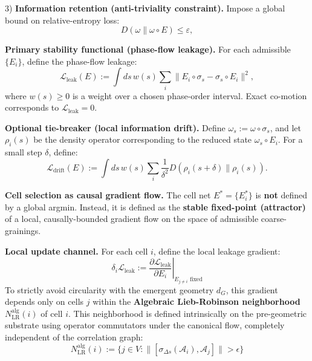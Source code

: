 \documentclass[reprint, amsmath, amssymb, aps, prd]{revtex4-2}
\begin{document}
3) \textbf{Information retention (anti-triviality constraint).} Impose a global bound on relative-entropy loss:
\begin{equation}
D( \omega \| \omega \circ E ) \leq \varepsilon,
\end{equation}

\textbf{Primary stability functional (phase-flow leakage).} For each admissible $\{E_i\}$, define the phase-flow leakage:
\begin{equation}
\mathcal{L}_{\text{leak}}(E) := \int ds \, w(s) \sum_i \| E_i \circ \sigma_s - \sigma_s \circ E_i \|^2,
\end{equation}
where $w(s) \geq 0$ is a weight over a chosen phase-order interval. Exact co-motion corresponds to $\mathcal{L}_{\text{leak}} = 0$.

\textbf{Optional tie-breaker (local information drift).} Define $\omega_s := \omega \circ \sigma_s$, and let $\rho_i(s)$ be the density operator corresponding to the reduced state $\omega_s \circ E_i$. For a small step $\delta$, define:
\begin{equation}
\mathcal{L}_{\text{drift}}(E) := \int ds \, w(s) \sum_i \frac{1}{\delta^2} D( \rho_i(s+\delta) \| \rho_i(s) ).
\end{equation}

\textbf{Cell selection as causal gradient flow.}
The cell net $E^* = \{E_i^*\}$ is \textbf{not} defined by a global argmin. Instead, it is defined as the \textbf{stable fixed-point (attractor)} of a local, causally-bounded gradient flow on the space of admissible coarse-grainings.

\textbf{Local update channel.} For each cell $i$, define the local leakage gradient:
\begin{equation}
\delta_i \mathcal{L}_{\text{leak}} := \left. \frac{\partial \mathcal{L}_{\text{leak}}}{\partial E_i} \right|_{E_{j \neq i} \text{ fixed}}
\end{equation}
To strictly avoid circularity with the emergent geometry $d_G$, this gradient depends only on cells $j$ within the \textbf{Algebraic Lieb-Robinson neighborhood} $N_{\text{LR}}^{\text{alg}}(i)$ of cell $i$. This neighborhood is defined intrinsically on the pre-geometric substrate using operator commutators under the canonical flow, completely independent of the correlation graph:
\begin{equation}
N_{\text{LR}}^{\text{alg}}(i) := \{ j \in V : \| [\sigma_{\Delta s}(\mathcal{A}_i), \mathcal{A}_j] \| > \epsilon \}
\end{equation}
\end{document}
